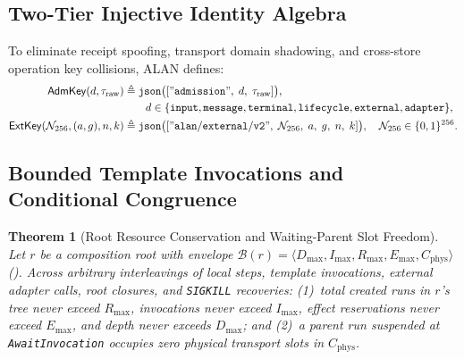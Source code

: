 \documentclass[11pt,a4paper]{article}
\newtheorem{theorem}{Theorem}[section]
\theoremstyle{definition}
\theoremstyle{remark}
\begin{document}
\subsection{Two-Tier Injective Identity Algebra}
To eliminate receipt spoofing, transport domain shadowing, and cross-store operation key collisions, ALAN defines:
\begin{align}
  \mathsf{AdmKey}(d, \tau_{\text{raw}}) &\triangleq \mathtt{json}\big([\mathtt{"admission"},\; d,\; \tau_{\text{raw}}]\big), \nonumber\\
  &\qquad d \in \{\mathtt{input},\mathtt{message},\mathtt{terminal},\mathtt{lifecycle},\mathtt{external},\mathtt{adapter}\}, \\
  \mathsf{ExtKey}(\mathcal{N}_{256}, (a,g), n, k) &\triangleq \mathtt{json}\big([\mathtt{"alan/external/v2"},\; \mathcal{N}_{256},\; a,\; g,\; n,\; k]\big), \quad \mathcal{N}_{256} \in \{0,1\}^{256}.
\end{align}

\subsection{Bounded Template Invocations and Conditional Congruence}

\begin{theorem}[Root Resource Conservation and Waiting-Parent Slot Freedom]
\label{thm:conservation}
Let $r$ be a composition root with envelope $\mathcal{B}(r) = \langle D_{\max}, I_{\max}, R_{\max}, E_{\max}, C_{\text{phys}} \rangle$ (). Across arbitrary interleavings of local steps, template invocations, external adapter calls, root closures, and \texttt{SIGKILL} recoveries: (1)~total created runs in $r$'s tree never exceed $R_{\max}$, invocations never exceed $I_{\max}$, effect reservations never exceed $E_{\max}$, and depth never exceeds $D_{\max}$; and (2)~a parent run suspended at \texttt{AwaitInvocation} occupies zero physical transport slots in $C_{\text{phys}}$.
\end{theorem}
\end{document}
